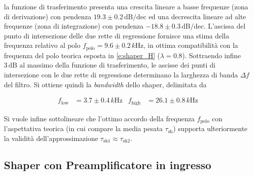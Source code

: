 \documentclass[a4paper,11pt]{article} %
\begin{document}
la funzione di trasferimento presenta una crescita lineare a basse frequenze (zona di derivazione) con pendenza $19.3
\pm 0.2 \,\text{dB/dec}$ ed una decrescita lineare ad alte frequenze (zona di integrazione) con pendenza $-18.8 \pm 0.3
\,\text{dB/dec}$. L'ascissa del punto di intersezione delle due rette di regressione fornisce una stima della frequenza
relativo al polo $f_{\text{polo}} = 9.6 \pm 0.2 \,\si{k\Hz}$, in ottima compatibilità con la frequenza del polo teorica
esposta in \autoref{e:shaper_H} ($\lambda = 0.8$). Sottraendo infine $3\,\text{dB}$ al massimo della funzione di
trasferimento, le ascisse dei punti di intersezione con le due rette di regressione determinano la larghezza di banda
$\Delta f$ del filtro. Si ottiene quindi la \textit{bandwidth} dello shaper, delimitata da 

\begin{align}\label{e:shaper_bw} 
	f_{\text{low}} &= 3.7 \pm 0.4 \,\si{k\Hz} 
	& 
	f_{\text{high}} &= 26.1 \pm 0.8\,\si{k\Hz} 
\end{align}

Si vuole infine sottolineare che l'ottimo accordo della frequenza $f_{\text{polo}}$ con l'aspettativa teorica (in cui
compare la media pesata $\tau_{\text{sh}}$) supporta ulteriormente la validità dell'approssimazione $\tau_{\text{sh}1}
\approx \tau_{\text{sh}2}$.


\subsection{Shaper con Preamplificatore in ingresso}\label{s:shaper_preamp}
\end{document}
